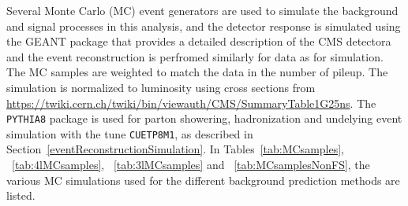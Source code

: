 Several Monte Carlo (MC) event generators are used to simulate the background and signal processes in this analysis, and the detector response is simulated using the GEANT package that 
provides a detailed description of the CMS detectora and the event reconstruction is perfromed similarly for data as for simulation. The MC samples are weighted to match the data in the number of 
pileup. The simulation is normalized to luminosity using cross sections from \url{https://twiki.cern.ch/twiki/bin/viewauth/CMS/SummaryTable1G25ns}.
The \texttt{PYTHIA8} \cite{Sjostrand:2006za} package is used for parton showering, hadronization and undelying event simulation with the tune \texttt{CUETP8M1}, as described in Section~\ref{eventReconstructionSimulation}.
In Tables~\ref{tab:MCsamples}, ~\ref{tab:4lMCsamples}, ~\ref{tab:3lMCsamples} and  ~\ref{tab:MCsamplesNonFS}, the various MC simulations used for the different background prediction methods 
are listed.

